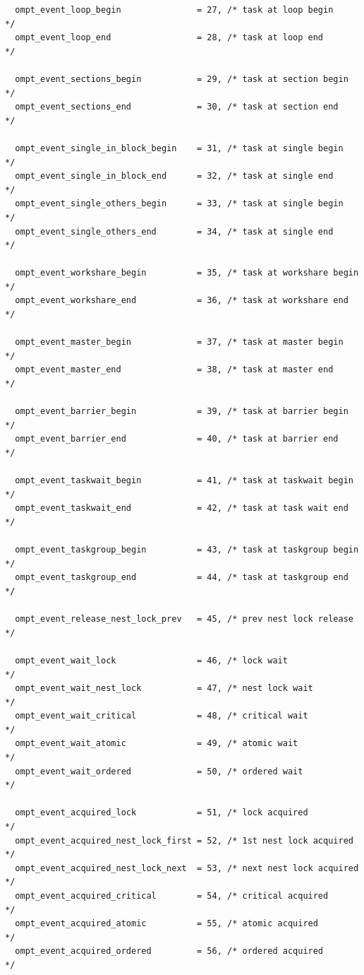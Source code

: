 \documentclass{article}
\begin{document}
\begin{verbatim}
  ompt_event_loop_begin               = 27, /* task at loop begin         */
  ompt_event_loop_end                 = 28, /* task at loop end           */
  
  ompt_event_sections_begin           = 29, /* task at section begin      */
  ompt_event_sections_end             = 30, /* task at section end        */
  
  ompt_event_single_in_block_begin    = 31, /* task at single begin       */
  ompt_event_single_in_block_end      = 32, /* task at single end         */
  ompt_event_single_others_begin      = 33, /* task at single begin       */
  ompt_event_single_others_end        = 34, /* task at single end         */
	
  ompt_event_workshare_begin          = 35, /* task at workshare begin    */		              	 			    
  ompt_event_workshare_end            = 36, /* task at workshare end      */	
	              	 			    
  ompt_event_master_begin             = 37, /* task at master begin       */
  ompt_event_master_end               = 38, /* task at master end         */
  
  ompt_event_barrier_begin            = 39, /* task at barrier begin      */
  ompt_event_barrier_end              = 40, /* task at barrier end        */
  
  ompt_event_taskwait_begin           = 41, /* task at taskwait begin     */
  ompt_event_taskwait_end             = 42, /* task at task wait end      */
  
  ompt_event_taskgroup_begin          = 43, /* task at taskgroup begin    */
  ompt_event_taskgroup_end            = 44, /* task at taskgroup end      */

  ompt_event_release_nest_lock_prev   = 45, /* prev nest lock release     */
								    
  ompt_event_wait_lock                = 46, /* lock wait                  */
  ompt_event_wait_nest_lock           = 47, /* nest lock wait             */
  ompt_event_wait_critical            = 48, /* critical wait              */
  ompt_event_wait_atomic              = 49, /* atomic wait                */
  ompt_event_wait_ordered             = 50, /* ordered wait               */
		 	            				    	    
  ompt_event_acquired_lock            = 51, /* lock acquired              */
  ompt_event_acquired_nest_lock_first = 52, /* 1st nest lock acquired     */
  ompt_event_acquired_nest_lock_next  = 53, /* next nest lock acquired    */
  ompt_event_acquired_critical        = 54, /* critical acquired          */
  ompt_event_acquired_atomic          = 55, /* atomic acquired            */
  ompt_event_acquired_ordered         = 56, /* ordered acquired           */
			            				    	    

\end{verbatim}
\end{document}
